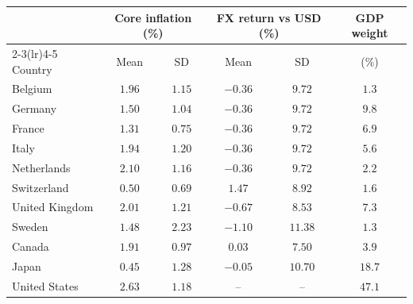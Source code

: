 \small
\setlength{\tabcolsep}{6pt}
\begin{tabular}{l cc cc c}
  \toprule
  & \multicolumn{2}{c}{Core inflation (\%)} & \multicolumn{2}{c}{FX return vs USD (\%)} & GDP weight \\
  \cmidrule(lr){2-3}\cmidrule(lr){4-5}
  Country & Mean & SD & Mean & SD & (\%) \\
  \midrule
  Belgium        & $1.96$ & $1.15$ & $-0.36$ & $9.72$  & $1.3$  \\
  Germany        & $1.50$ & $1.04$ & $-0.36$ & $9.72$  & $9.8$  \\
  France         & $1.31$ & $0.75$ & $-0.36$ & $9.72$  & $6.9$  \\
  Italy          & $1.94$ & $1.20$ & $-0.36$ & $9.72$  & $5.6$  \\
  Netherlands    & $2.10$ & $1.16$ & $-0.36$ & $9.72$  & $2.2$  \\
  Switzerland    & $0.50$ & $0.69$ & $1.47$  & $8.92$  & $1.6$  \\
  United Kingdom & $2.01$ & $1.21$ & $-0.67$ & $8.53$  & $7.3$  \\
  Sweden         & $1.48$ & $2.23$ & $-1.10$ & $11.38$ & $1.3$  \\
  Canada         & $1.91$ & $0.97$ & $0.03$  & $7.50$  & $3.9$  \\
  Japan          & $0.45$ & $1.28$ & $-0.05$ & $10.70$ & $18.7$ \\
  United States  & $2.63$ & $1.18$ & --      & --      & $47.1$ \\
  \bottomrule
\end{tabular}
